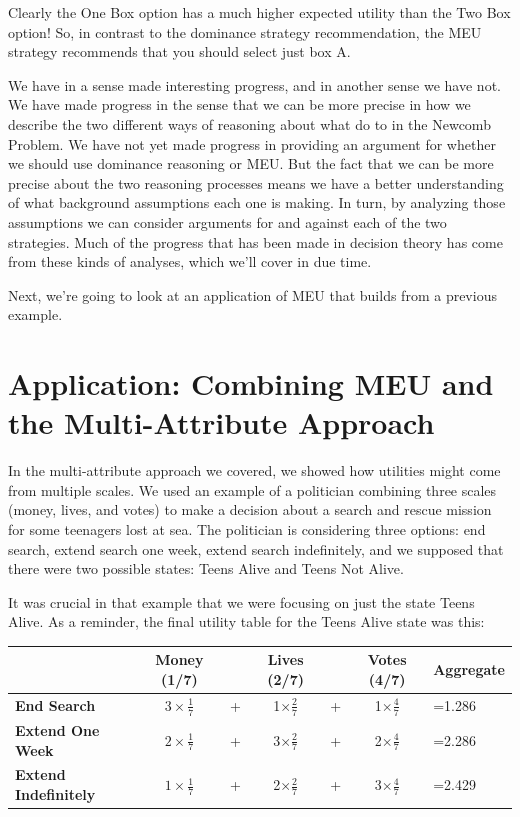 \documentclass[]{tufte-book}
\begin{document}
Clearly the One Box option has a much higher expected utility than the Two Box option! So, in contrast to the dominance strategy recommendation, the MEU strategy recommends that you should select just box A.

We have in a sense made interesting progress, and in another sense we have not. We have made progress in the sense that we can be more precise in how we describe the two different ways of reasoning about what do to in the Newcomb Problem. We have not yet made progress in providing an argument for whether we should use dominance reasoning or MEU. But the fact that we can be more precise about the two reasoning processes means we have a better understanding of what background assumptions each one is making. In turn, by analyzing those assumptions we can consider arguments for and against each of the two strategies. Much of the progress that has been made in decision theory has come from these kinds of analyses, which we'll cover in due time.

Next, we're going to look at an application of MEU that builds from a previous example.

\hypertarget{application-combining-meu-and-the-multi-attribute-approach}{%
\section{Application: Combining MEU and the Multi-Attribute Approach}\label{application-combining-meu-and-the-multi-attribute-approach}}

In the multi-attribute approach we covered, we showed how utilities might come from multiple scales. We used an example of a politician combining three scales (money, lives, and votes) to make a decision about a search and rescue mission for some teenagers lost at sea. The politician is considering three options: end search, extend search one week, extend search indefinitely, and we supposed that there were two possible states: Teens Alive and Teens Not Alive.

It was crucial in that example that we were focusing on just the state Teens Alive. As a reminder, the final utility table for the Teens Alive state was this:

\begin{longtable}[]{@{}lclclcl@{}}
\toprule
& Money (1/7) & & Lives (2/7) & & Votes (4/7) & Aggregate\tabularnewline
\midrule
\endhead
\textbf{End Search} & \(3\times \frac{1}{7}\) & + & 1\(\times \frac{2}{7}\) & + & 1\(\times \frac{4}{7}\) & =1.286\tabularnewline
\textbf{Extend One Week} & \(2\times \frac{1}{7}\) & + & 3\(\times \frac{2}{7}\) & + & 2\(\times \frac{4}{7}\) & =2.286\tabularnewline
\textbf{Extend Indefinitely} & \(1\times \frac{1}{7}\) & + & 2\(\times \frac{2}{7}\) & + & 3\(\times \frac{4}{7}\) & =2.429\tabularnewline
\bottomrule
\end{longtable}
\end{document}
